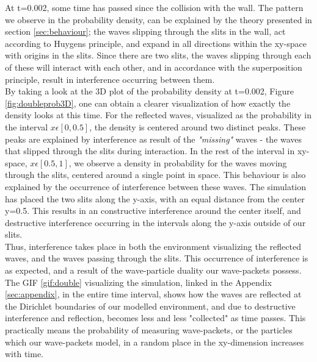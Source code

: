 \documentclass[10pt, nofootinbib, twocolumn]{revtex4-1}
\begin{document}
At t=0.002, some time has passed since the collision with the wall. The pattern we observe in the probability density, can be explained by the theory presented in section \ref{sec:behaviour}; the waves slipping through the slits in the wall, act according to Huygens principle, and expand in all directions within the xy-space with origins in the slits. Since there are two slits, the waves slipping through each of these will interact with each other, and in accordance with the superposition principle, result in interference occurring between them. \\

By taking a look at the 3D plot of the probability density at t=0.002, Figure \ref{fig:doubleprob3D}, one can obtain a clearer visualization of how exactly the density looks at this time. For the reflected waves, visualized as the probability in the interval $x\epsilon [0,0.5]$, the density is centered around two distinct peaks. These peaks are explained by interference as result of the \textit{"missing"} waves - the waves that slipped through the slits during interaction. In the rest of the interval in xy-space, $x\epsilon [0.5,1]$, we observe a density in probability for the waves moving through the slits, centered around a single point in space. This behaviour is also explained by the occurrence of interference between these waves. The simulation has placed the two slits along the y-axis, with an equal distance from the center y=0.5. This results in an constructive interference around the center itself, and destructive interference occurring in the intervals along the y-axis outside of our slits. \\

Thus, interference takes place in both the environment visualizing the reflected waves, and the waves passing through the slits. This occurrence of interference is as expected, and a result of the wave-particle duality our wave-packets possess. \\

The GIF \ref{gif:double} visualizing the simulation, linked in the Appendix \ref{sec:appendix}, in the entire time interval, shows how the waves are reflected at the Dirichlet boundaries of our modelled environment, and due to destructive interference and reflection, becomes less and less "collected" as time passes. This practically means the probability of measuring wave-packets, or the particles which our wave-packets model, in a random place in the xy-dimension increases with time. \\
\end{document}

